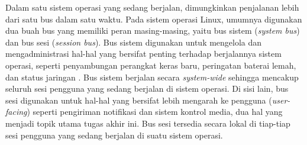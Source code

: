 Dalam satu sistem operasi yang sedang berjalan, dimungkinkan penjalanan lebih dari satu bus dalam satu waktu. Pada sistem operasi Linux, umumnya digunakan dua buah bus yang memiliki peran masing-masing, yaitu bus sistem (\textit{system bus}) dan bus sesi (\textit{session bus}). Bus sistem digunakan untuk mengelola dan mengadministrasi hal-hal yang bersifat penting terhadap berjalannya sistem operasi, seperti penyambungan perangkat keras baru, peringatan baterai lemah, dan status jaringan \cite{will2020trusted}. Bus sistem berjalan secara \textit{system-wide} sehingga mencakup seluruh sesi pengguna yang sedang berjalan di sistem operasi. Di sisi lain, bus sesi digunakan untuk hal-hal yang bersifat lebih mengarah ke pengguna (\textit{user-facing}) seperti pengiriman notifikasi dan sistem kontrol media, dua hal yang menjadi topik utama tugas akhir ini. Bus sesi tersedia secara lokal di tiap-tiap sesi pengguna yang sedang berjalan di suatu sistem operasi.

